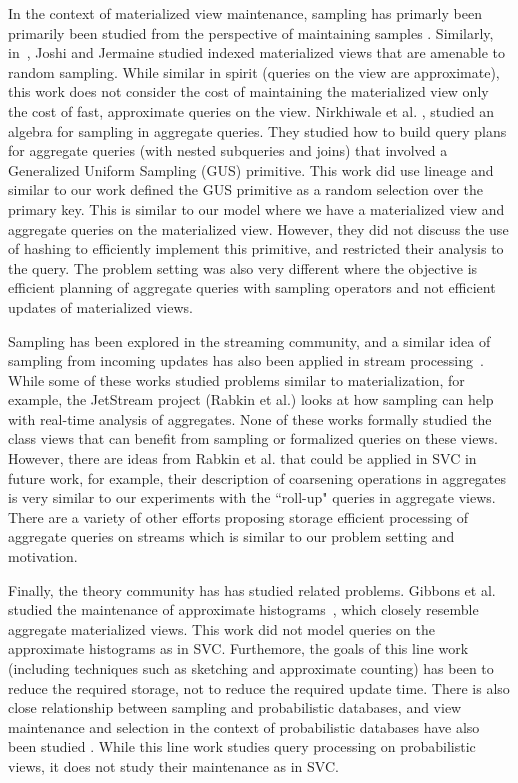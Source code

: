 In the context of materialized view maintenance, sampling has primarly been primarily been studied from the perspective of maintaining samples \cite{DBLP:conf/icde/OlkenR92}.
Similarly, in~\cite{joshi2008materialized}, Joshi and Jermaine studied indexed materialized views that are amenable to random sampling.
While similar in spirit (queries on the view are approximate), this work does not consider the cost of maintaining the materialized view only the cost of fast, approximate queries on the view.
Nirkhiwale et al. \cite{DBLP:journals/pvldb/NirkhiwaleDJ13}, studied an algebra for sampling in aggregate queries.
They studied how to build query plans for aggregate queries (with nested subqueries and joins) that involved a Generalized Uniform Sampling (GUS) primitive.
This work did use lineage and similar to our work defined the GUS primitive as a random selection over the primary key.
This is similar to our model where we have a materialized view and aggregate queries on the materialized view.
However, they did not discuss the use of hashing to efficiently implement this primitive, and restricted their analysis to the \sumfunc query.
The problem setting was also very different where the objective is efficient planning of aggregate queries with sampling operators and not efficient updates of materialized views.

Sampling has been explored in the streaming community, and a similar idea of sampling from incoming updates has also been applied in stream processing~\cite{tatbul2003load, Garofalakis, rabkin2014aggregation}.
While some of these works studied problems similar to materialization, for example, the JetStream project (Rabkin et al.) looks at how sampling can help with real-time analysis of aggregates.
None of these works formally studied the class views that can benefit from sampling or formalized queries on these views.
However, there are ideas from Rabkin et al. that could be applied in SVC in future work, for example, their description of coarsening operations in aggregates is very similar to our experiments with the ``roll-up" queries in aggregate views.
There are a variety of other efforts proposing storage efficient processing of aggregate queries on streams \cite{dobra2002processing, greenwald2001space} which is similar to our problem setting and motivation.

Finally, the theory community has has studied related problems.
Gibbons et al. studied the maintenance of approximate histograms~\cite{gibbons1997fast}, which closely resemble aggregate materialized views.
This work did not model queries on the approximate histograms as in SVC.
Furthemore, the goals of this line work (including techniques such as sketching and approximate counting) has been to reduce the required storage, not to reduce the required update time.
There is also close relationship between sampling and probabilistic databases, and view maintenance and selection in the context of probabilistic databases have also been studied \cite{re2007materialized}.
While this line work studies query processing on probabilistic views, it does not study their maintenance as in SVC.

